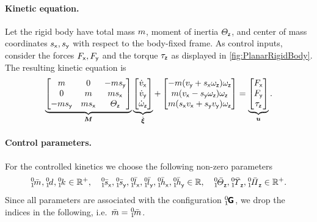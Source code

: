 \paragraph{Kinetic equation.}
Let the rigid body have total mass $m$, moment of inertia $\varTheta_{\mathsf{z}}$, and center of mass coordinates $s_{\mathsf{x}},s_{\mathsf{y}}$ with respect to the body-fixed frame.
As control inputs, consider the forces $F_{\mathsf{x}}, F_{\mathsf{y}}$ and the torque $\tau_{\mathsf{z}}$ as displayed in \autoref{fig:PlanarRigidBody}.
The resulting kinetic equation is
\begin{align}
 \underbrace{\begin{bmatrix} m & 0 & -ms_{\mathsf{y}} \\ 0 & m & ms_{\mathsf{x}} \\ -ms_{\mathsf{y}} & ms_{\mathsf{x}} & \varTheta_{\mathsf{z}} \end{bmatrix}}_{\boldsymbol{M}}
 \underbrace{\begin{bmatrix} \dot{v}_{\mathsf{x}} \\ \dot{v}_{\mathsf{y}} \\ \dot{\omega}_{\mathsf{z}} \end{bmatrix}}_{\dot{\boldsymbol{\xi}}}
 +
 \begin{bmatrix} -m(v_{\mathsf{y}} + s_{\mathsf{x}}\omega_{\mathsf{z}}) \omega_{\mathsf{z}} \\ m(v_{\mathsf{x}}-s_{\mathsf{y}}\omega_{\mathsf{z}})\omega_{\mathsf{z}} \\ m(s_{\mathsf{x}}v_{\mathsf{x}}+s_{\mathsf{y}}v_{\mathsf{y}})\omega_{\mathsf{z}} \end{bmatrix}
 =
 \underbrace{\begin{bmatrix} F_{\mathsf{x}} \\ F_{\mathsf{y}} \\ \tau_{\mathsf{z}} \end{bmatrix}}_{\boldsymbol{u}}.
\end{align}

\paragraph{Control parameters.}
For the controlled kinetics we choose the following non-zero parameters
\begin{align}\label{eq:CtrlParamPlanarRigidBody}
 \bodyMassC{0}{1}, \bodyDamping{0}{1}, \bodyStiffness{0}{1} \in \RealNum^+,
\quad
 \bodyCOMCoeffC{0}{1}{\idxX}, \bodyCOMCoeffC{0}{1}{\idxY}, \bodyCODCoeffC{0}{1}{\idxX}, \bodyCODCoeffC{0}{1}{\idxY}, \bodyCOSCoeffC{0}{1}{\idxX}, \bodyCOSCoeffC{0}{1}{\idxY} \in \RealNum,
\quad
 \bodyMOICoeffC{0}{1}{\idxZ}, \bodyMODCoeffC{0}{1}{\idxZ}, \bodyMOSCoeffC{0}{1}{\idxZ} \in \RealNum^+ .
\end{align}
Since all parameters are associated with the configuration $\bodyHomoCoord{0}{1}$, we drop the indices in the following, i.e.\ $\mc = \bodyMassC{0}{1}$.

